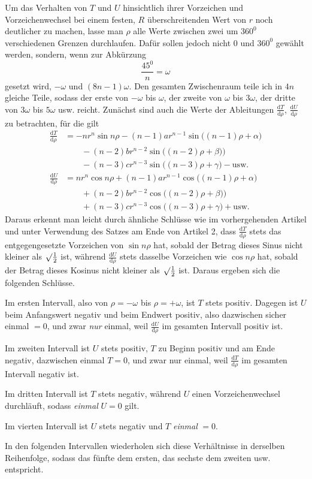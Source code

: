 Um das Verhalten von $T$ und $U$ hinsichtlich ihrer Vorzeichen und Vorzeichenwechsel bei einem festen, $R$ überschreitenden Wert von $r$ noch deutlicher zu machen, lasse man $\rho$ alle Werte zwischen zwei um $360^0$ verschiedenen Grenzen durchlaufen. Dafür sollen jedoch nicht $0$ und $360^0$ gewählt werden, sondern, wenn zur Abkürzung
\[
\frac{45^0}{n}=\omega
\]
gesetzt wird, $-\omega$ und $(8n-1)\omega$. Den gesamten Zwischenraum teile ich in $4n$ gleiche Teile, sodass der erste von $-\omega$ bis $\omega$, der zweite von $\omega$ bis $3\omega$, der dritte von $3\omega$ bis $5\omega$ usw. reicht. Zunächst sind auch die Werte der Ableitungen $\frac{\mathrm{d}T}{\mathrm{d}\rho}$, $\frac{\mathrm{d}U}{\mathrm{d}\rho}$ zu betrachten, für die gilt
\[
\begin{array}{rl}
\frac{\mathrm{d}T}{\mathrm{d}\rho}
&=-nr^n\sin n\rho-(n-1)ar^{n-1}\sin\bigl((n-1)\rho+\alpha\bigr)\\
&\qquad -(n-2)br^{n-2}\sin\bigl((n-2)\rho+\beta)\bigr)\\
&\qquad -(n-3)cr^{n-3}\sin\bigl((n-3)\rho+\gamma\bigr)-\mathrm{usw.}\\
\frac{\mathrm{d}U}{\mathrm{d}\rho}
&=nr^n\cos n\rho+(n-1)ar^{n-1}\cos\bigl((n-1)\rho+\alpha\bigr)\\
&\qquad +(n-2)br^{n-2}\cos\bigl((n-2)\rho+\beta)\bigr)\\
&\qquad +(n-3)cr^{n-3}\cos\bigl((n-3)\rho+\gamma\bigr)+\mathrm{usw.}
\end{array}
\]
Daraus erkennt man leicht durch ähnliche Schlüsse wie im vorhergehenden Artikel und unter Verwendung des Satzes am Ende von Artikel 2, dass $\frac{\mathrm{d}T}{\mathrm{d}\rho}$ stets das entgegengesetzte Vorzeichen von $\sin n\rho$ hat, sobald der Betrag dieses Sinus nicht kleiner als $\surd\frac{1}{2}$ ist, während $\frac{\mathrm{d}U}{\mathrm{d}\rho}$ stets dasselbe Vorzeichen wie $\cos n\rho$ hat, sobald der Betrag dieses Kosinus nicht kleiner als $\surd\frac{1}{2}$ ist. Daraus ergeben sich die folgenden Schlüsse.

Im ersten Intervall, also von $\rho=-\omega$ bis $\rho=+\omega$, ist $T$ stets positiv. Dagegen ist $U$ beim Anfangswert negativ und beim Endwert positiv, also dazwischen sicher einmal $=0$, und zwar \emph{nur} einmal, weil $\frac{\mathrm{d}U}{\mathrm{d}\rho}$ im gesamten Intervall positiv ist.

Im zweiten Intervall ist $U$ stets positiv, $T$ zu Beginn positiv und am Ende negativ, dazwischen einmal $T=0$, und zwar nur einmal, weil $\frac{\mathrm{d}T}{\mathrm{d}\rho}$ im gesamten Intervall negativ ist.

Im dritten Intervall ist $T$ stets negativ, während $U$ einen Vorzeichenwechsel durchläuft, sodass \emph{einmal} $U=0$ gilt.

Im vierten Intervall ist $U$ stets negativ und $T$ \emph{einmal} $=0$.

In den folgenden Intervallen wiederholen sich diese Verhältnisse in derselben Reihenfolge, sodass das fünfte dem ersten, das sechste dem zweiten usw. entspricht.

